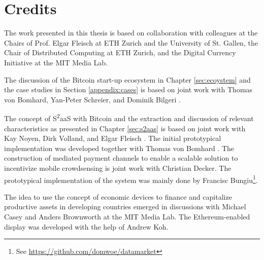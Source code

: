 
\section{Credits}

The work presented in this thesis is based on collaboration with colleagues at the Chairs of Prof. Elgar Fleisch at ETH Zurich and the University of St. Gallen, the Chair of Distributed Computing at ETH Zurich, and the Digital Currency Initiative at the MIT Media Lab. 

The discussion of the Bitcoin start-up ecosystem in Chapter \ref{sec:ecoystem} and the case studies in Section \ref{appendix:cases} is based on joint work with Thomas von Bomhard, Yan-Peter Schreier, and Dominik Bilgeri \parencite[c.f.]{Worner2016ecis}.

The concept of S\textsuperscript{2}aaS with Bitcoin and the extraction and discussion of relevant characteristics as presented in Chapter \ref{sec:s2aas} is based on joint work with Kay Noyen, Dirk Volland, and Elgar Fleisch \parencite[c.f.]{DBLP:journals/corr/NoyenVWF14}. The initial prototypical implementation was developed together with Thomas von Bomhard \parencite[c.f.]{Worner:2014:YSE:2638728.2638786}.
The construction of mediated payment channels to enable a scalable solution to incentivize mobile crowdsensing is joint work with Christian Decker. The prototypical implementation of the system was mainly done by Francisc Bungiu\footnote{See \url{https://github.com/domwoe/datamarket}}. 

The idea to use the concept of economic devices to finance and capitalize productive assets in developing countries emerged in discussions with Michael Casey and Anders Brownworth at the MIT Media Lab. The Ethereum-enabled display was developed with the help of Andrew Koh. 
